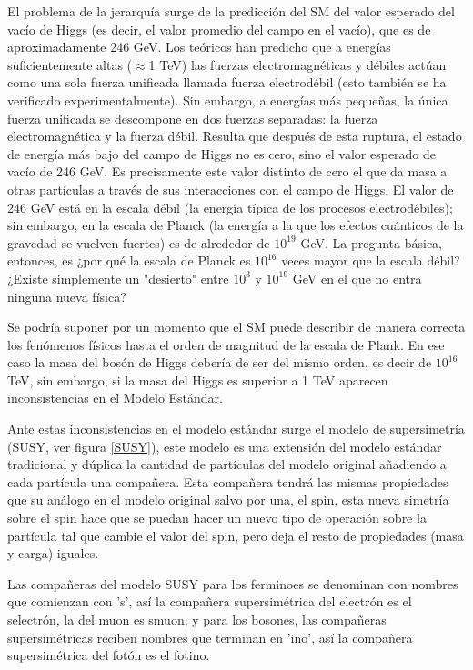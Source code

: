 \documentclass[journal]{IEEEtran}
\begin{document}
El problema de la jerarquía surge de la predicción del SM del valor esperado del vacío de Higgs (es decir, el valor promedio del campo en el vacío), que es de aproximadamente 246 GeV. Los teóricos han predicho que a energías suficientemente altas ($\approx$1 TeV) las fuerzas electromagnéticas y débiles actúan como una sola fuerza unificada llamada fuerza electrodébil (esto también se ha verificado experimentalmente). Sin embargo, a energías más pequeñas, la única fuerza unificada se descompone en dos fuerzas separadas: la fuerza electromagnética y la fuerza débil. Resulta que después de esta ruptura, el estado de energía más bajo del campo de Higgs no es cero, sino el valor esperado de vacío de 246 GeV. Es precisamente este valor distinto de cero el que da masa a otras partículas a través de sus interacciones con el campo de Higgs. El valor de 246 GeV está en la escala débil (la energía típica de los procesos electrodébiles); sin embargo, en la escala de Planck (la energía a la que los efectos cuánticos de la gravedad se vuelven fuertes) es de alrededor de $10^{19}$ GeV. La pregunta básica, entonces, es ¿por qué la escala de Planck es $10^{16}$ veces mayor que la escala débil? ¿Existe simplemente un "desierto" entre $10^{3}$ y $10^{19}$ GeV en el que no entra ninguna nueva física?\hspace{.2cm}\cite{K. Garrett}

Se podría suponer por un momento que el SM  puede describir de manera correcta los fenómenos físicos hasta el orden de magnitud de la escala de Plank. En ese caso la masa del bosón de Higgs debería de ser del mismo orden, es decir de $10^{16}$ TeV, sin embargo, si la masa del Higgs es superior a 1 TeV aparecen inconsistencias en el Modelo Estándar.\hspace{.2cm}\cite{P. Gonzales}

Ante estas inconsistencias en el modelo estándar surge el modelo de supersimetría (SUSY, ver figura \ref{SUSY}), este modelo es una extensión del modelo estándar tradicional y dúplica la cantidad de partículas del modelo original añadiendo a cada partícula una compañera. Esta compañera tendrá las mismas propiedades que su análogo en el modelo original salvo por una, el spin, esta nueva simetría sobre el spin hace que se puedan hacer un nuevo tipo de operación sobre la partícula tal que cambie el valor del spin, pero deja el resto de propiedades (masa y carga) iguales.

Las compañeras del modelo SUSY para los ferminoes se denominan con nombres que comienzan con 's', así la compañera supersimétrica del electrón es el selectrón, la del muon es smuon; y para los bosones, las compañeras supersimétricas reciben nombres que terminan en 'ino', así la compañera supersimétrica del fotón es el fotino.
\end{document}
